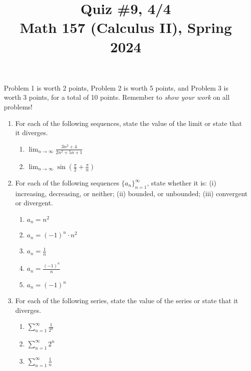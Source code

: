 \documentclass[11pt]{article}
\title{Quiz \#9, 4/4\\ Math 157 (Calculus II), Spring 2024}
\date{}
\begin{document}
\maketitle

\thispagestyle{empty}

\vspace{-2cm}

Problem 1 is worth 2 points, Problem 2 is worth 5 points, and Problem 3 is worth 3 points, for a total of 10 points. Remember to \emph{show your work} on all problems!

\begin{enumerate}

\item For each of the following sequences, state the value of the limit or state that it diverges.

\begin{enumerate}
\item $\displaystyle \lim_{n\to \infty} \frac{3n^2+4}{2n^2+5n+1}$ \\[5pt]
\item $\displaystyle \lim_{n\to \infty} \sin\left(\frac{\pi}{2}+\frac{\pi}{n}\right)$
\end{enumerate}

\vspace{0.75in}

\item For each of the following sequences $\{a_n\}_{n=1}^{\infty}$, state whether it is: (i) increasing, decreasing, or neither; (ii) bounded, or unbounded; (iii) convergent or divergent.

\begin{enumerate}
\item $a_n = n^2$ \\[2pt]
\item $a_n = (-1)^n \cdot n^2$ \\[2pt]
\item $a_n = \displaystyle \frac{1}{n}$ \\[2pt]
\item $a_n = \displaystyle \frac{(-1)^n}{n}$ \\[2pt]
\item $a_n = (-1)^n$
\end{enumerate}

\vspace{0.75in}

\item For each of the following series, state the value of the series or state that it diverges.

\begin{enumerate}
\item $\displaystyle \sum_{n=1}^{\infty} \frac{1}{2^n}$ \\[2pt]
\item $\displaystyle \sum_{n=1}^{\infty} 2^n$ \\[2pt]
\item $\displaystyle \sum_{n=1}^{\infty} \frac{1}{n}$
\end{enumerate}

\end{enumerate}
\end{document}
